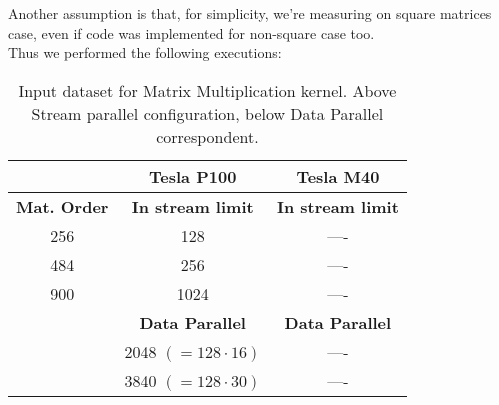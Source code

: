 Another assumption is that, for simplicity, we're measuring on square matrices case, even if code was implemented for non-square case too. \\
Thus we performed the following executions:

	\begin{table}	
		\centering
		\begin{tabular}{| c | c | c |} 
			\hline
			
			  & \textbf{Tesla P100} & \textbf{Tesla M40} \\ 
			\hline\hline
			
			\textbf{Mat. Order} & \textbf{In stream limit} &  \textbf{In stream limit}  \\ 
			\hline
			256 & 128 & ----  \\ 
			\hline		
			484	& 256 & ----  \\ 
			\hline			
			900 & 1024 & ----  \\
			\hline
			\hline				
			
			 & \textbf{Data Parallel} & \textbf{Data Parallel} \\ 
			\hline\hline
			
			 & 2048 \((=128\cdot16)\) & ---- \\ 
			\hline
			 & 3840 \((=128\cdot30)\) & ---- \\  
			\hline
			
			
		\end{tabular}
		\caption{Input dataset for Matrix Multiplication kernel. Above Stream parallel configuration, below Data Parallel correspondent.}	
		\label{tab:matdata}		
	\end{table}
	
